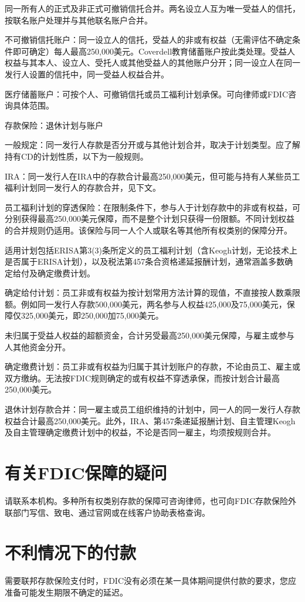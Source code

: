 \documentclass[UTF8,fontset=none,11pt,a4paper]{ctexart}
\begin{document}
同一所有人的正式及非正式可撤销信托合并。两名设立人互为唯一受益人的信托，按联名账户处理并与其他联名账户合并。


不可撤销信托账户：同一设立人的信托，受益人的非或有权益（无需评估不确定条件即可确定）每人最高250,000美元。Coverdell教育储蓄账户按此类处理。受益人权益与其本人、设立人、受托人或其他受益人的其他账户分开；同一设立人在同一发行人设置的信托中，同一受益人权益合并。


医疗储蓄账户：可按个人、可撤销信托或员工福利计划承保。可向律师或FDIC咨询具体范围。


存款保险：退休计划与账户


一般规定：同一发行人存款是否分开或与其他计划合并，取决于计划类型。应了解持有CD的计划性质，以下为一般规则。


IRA：同一发行人在IRA中的存款合计最高250,000美元，但可能与持有人某些员工福利计划同一发行人的存款合并，见下文。


员工福利计划的穿透保险：在限制条件下，参与人于计划存款中的非或有权益，可分别获得最高250,000美元保障，而不是整个计划只获得一份限额。不同计划权益的合并规则仍适用。该保险与同一人个人或联名等其他所有权类别的保障分开。


适用计划包括ERISA第3(3)条所定义的员工福利计划（含Keogh计划，无论技术上是否属于ERISA计划），以及税法第457条合资格递延报酬计划，通常涵盖多数确定给付及确定缴费计划。


确定给付计划：员工非或有权益为按计划常用方法计算的现值，不直接按人数乘限额。例如同一发行人存款500,000美元，两名参与人权益425,000及75,000美元，保障仅325,000美元，即250,000加75,000美元。


未归属于受益人权益的超额资金，合计另受最高250,000美元保障，与雇主或参与人其他资金分开。


确定缴费计划：员工非或有权益为归属于其计划账户的存款，不论由员工、雇主或双方缴纳。无法按FDIC规则确定的或有权益不穿透承保，而按计划合计最高250,000美元。


退休计划存款合并：同一雇主或员工组织维持的计划中，同一人的同一发行人存款权益合计最高250,000美元。此外，IRA、第457条递延报酬计划、自主管理Keogh及自主管理确定缴费计划中的权益，不论是否同一雇主，均须按规则合并。


\section*{有关FDIC保障的疑问}
请联系本机构。多种所有权类别存款的保障可咨询律师，也可向FDIC存款保险外联部门写信、致电、通过官网或在线客户协助表格查询。


\section*{不利情况下的付款}
需要联邦存款保险支付时，FDIC没有必须在某一具体期间提供付款的要求，您应准备可能发生期限不确定的延迟。
\end{document}
